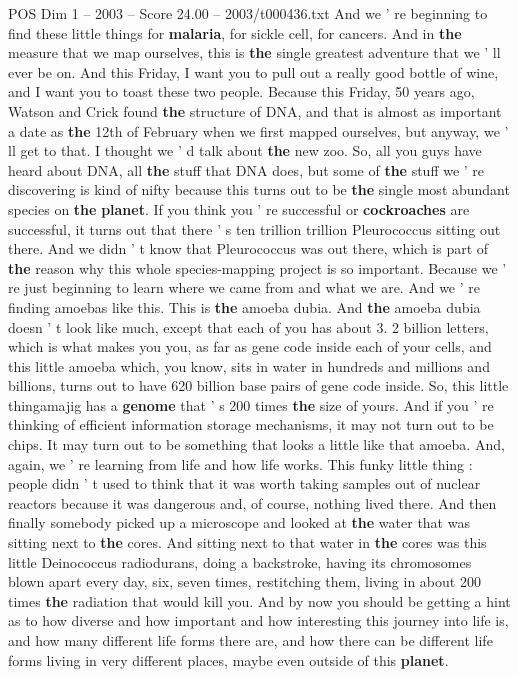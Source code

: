 \begin{textsample}{POS Dim 1 – 2003 – Score 24.00 – 2003/t000436.txt}
And we ' re beginning to find these little things for \textbf{malaria}, for sickle cell, for cancers.
And in \textbf{the} measure that we map ourselves, this is \textbf{the} single greatest adventure that we ' ll ever be on.
And this Friday, I want you to pull out a really good bottle of wine, and I want you to toast these two people.
Because this Friday, 50 years ago, Watson and Crick found \textbf{the} structure of DNA, and that is almost as important a date as \textbf{the} 12th of February when we first mapped ourselves, but anyway, we ' ll get to that.
I thought we ' d talk about \textbf{the} new zoo.
So, all you guys have heard about DNA, all \textbf{the} stuff that DNA does, but some of \textbf{the} stuff we ' re discovering is kind of nifty because this turns out to be \textbf{the} single most abundant species on \textbf{the} \textbf{planet}.
If you think you ' re successful or \textbf{cockroaches} are successful, it turns out that there ' s ten trillion trillion Pleurococcus sitting out there.
And we didn ' t know that Pleurococcus was out there, which is part of \textbf{the} reason why this whole species-mapping project is so important.
Because we ' re just beginning to learn where we came from and what we are.
And we ' re finding amoebas like this.
This is \textbf{the} amoeba dubia.
And \textbf{the} amoeba dubia doesn ' t look like much, except that each of you has about 3. 2 billion letters, which is what makes you you, as far as gene code inside each of your cells, and this little amoeba which, you know, sits in water in hundreds and millions and billions, turns out to have 620 billion base pairs of gene code inside.
So, this little thingamajig has a \textbf{genome} that ' s 200 times \textbf{the} size of yours.
And if you ' re thinking of efficient information storage mechanisms, it may not turn out to be chips.
It may turn out to be something that looks a little like that amoeba.
And, again, we ' re learning from life and how life works.
This funky little thing : people didn ' t used to think that it was worth taking samples out of nuclear reactors because it was dangerous and, of course, nothing lived there.
And then finally somebody picked up a microscope and looked at \textbf{the} water that was sitting next to \textbf{the} cores.
And sitting next to that water in \textbf{the} cores was this little Deinococcus radiodurans, doing a backstroke, having its chromosomes blown apart every day, six, seven times, restitching them, living in about 200 times \textbf{the} radiation that would kill you.
And by now you should be getting a hint as to how diverse and how important and how interesting this journey into life is, and how many different life forms there are, and how there can be different life forms living in very different places, maybe even outside of this \textbf{planet}.

\end{textsample}

